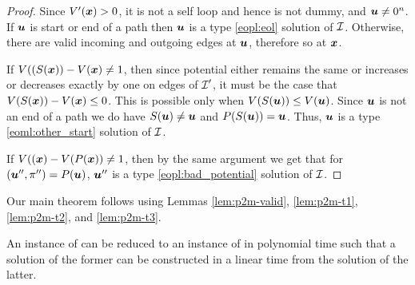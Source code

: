 \begin{proof}
Since $V'(\mbox{\boldmath $x$})>0$, it is not a self loop and hence is not dummy, and $\mbox{\boldmath $u$}\neq 0^n$. If $\mbox{\boldmath $u$}$ is start or end of a path then $\mbox{\boldmath $u$}$ is a type \ref{eopl:eol} solution of $\mbox{${\mathcal I}$}$. Otherwise, there are valid incoming and outgoing edges at $\mbox{\boldmath $u$}$, therefore so at $\mbox{\boldmath $x$}$. 

If $V((S(\mbox{\boldmath $x$}))-V(\mbox{\boldmath $x$})\neq 1$, then since potential either remains the same or increases or decreases exactly by one on edges of $\mbox{${\mathcal I}$}'$, it must be the case that $V(S(\mbox{\boldmath $x$}))-V(\mbox{\boldmath $x$})\le 0$. This is possible only when $V(S(\mbox{\boldmath $u$}))\le V(\mbox{\boldmath $u$})$. Since $\mbox{\boldmath $u$}$ is not an end of a path we do have $S(\mbox{\boldmath $u$})\neq \mbox{\boldmath $u$}$ and $P(S(\mbox{\boldmath $u$}))=\mbox{\boldmath $u$}$. Thus, $\mbox{\boldmath $u$}$ is a type \ref{eoml:other_start} solution of $\mbox{${\mathcal I}$}$.

If $V((\mbox{\boldmath $x$})-V(P(\mbox{\boldmath $x$}))\neq 1$, then by the same argument we get that for $(\mbox{\boldmath $u$}'',\pi'')=P(\mbox{\boldmath $u$})$, $\mbox{\boldmath $u$}''$ is a type \ref{eopl:bad_potential} solution of $\mbox{${\mathcal I}$}$. 
\end{proof}

Our main theorem follows using Lemmas \ref{lem:p2m-valid}, \ref{lem:p2m-t1}, \ref{lem:p2m-t2}, and \ref{lem:p2m-t3}.

\begin{theorem}\label{thm:p2m}
An instance of \EOPL can be reduced to an instance of \EOML in polynomial time such that a solution of the former can be constructed in a linear time from the solution of the latter. 
\end{theorem}